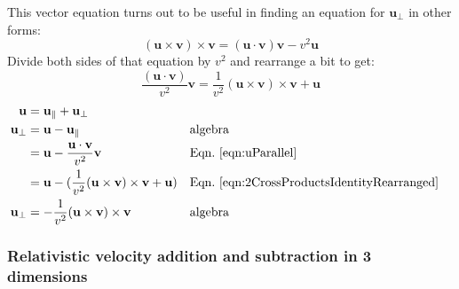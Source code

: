 \documentclass[a4paper]{article}
\theoremstyle{plain}
\theoremstyle{definition}
\newcommand{\vect}[1]{\mathbf{#1}}
\begin{document}
This vector equation turns out to be useful in finding an equation for
$\vect{u}_{\perp}$ in other forms:
\begin{equation}
(\vect{u} \times \vect{v}) \times \vect{v} = (\vect{u} \cdot \vect{v}) \vect{v} - v^2 \vect{u} \label{eqn:2CrossProductsIdentity}
\end{equation}
Divide both sides of that equation by $v^2$ and rearrange a bit to get:
\begin{equation}
\frac{(\vect{u} \cdot \vect{v})}{v^2} \vect{v} = \frac{1}{v^2} (\vect{u} \times \vect{v}) \times \vect{v} + \vect{u} \label{eqn:2CrossProductsIdentityRearranged}
\end{equation}
\begin{align}
\vect{u} & = \vect{u}_{\parallel} + \vect{u}_{\perp} \nonumber \\
\vect{u}_{\perp}
  & = \vect{u} - \vect{u}_{\parallel} & & \text{algebra} \nonumber \\
  & = \vect{u} - \frac{\vect{u} \cdot \vect{v}}{v^2} \vect{v} & & \text{Eqn.~\eqref{eqn:uParallel}} \nonumber \\
  & = \vect{u} - (\frac{1}{v^2} (\vect{u} \times \vect{v}) \times \vect{v} + \vect{u}) & & \text{Eqn.~\eqref{eqn:2CrossProductsIdentityRearranged}} \nonumber \\\vect{u}_{\perp}
  & = - \frac{1}{v^2} (\vect{u} \times \vect{v}) \times \vect{v} & & \text{algebra} \label{eqn:uPerpendicular}
\end{align}


\subsubsection{Relativistic velocity addition and subtraction in 3 dimensions}
\label{app:3drelvelocityadd}
\end{document}
